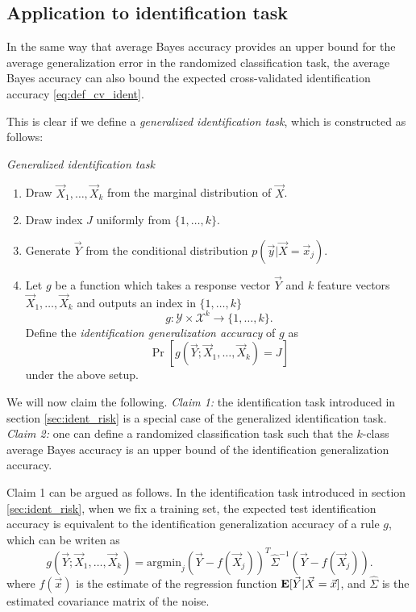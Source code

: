 \subsection{Application to identification task}\label{sec:ident_to_aba}

In the same way that average Bayes accuracy provides an upper bound
for the average generalization error in the randomized classification
task, the average Bayes accuracy can also bound the expected
cross-validated identification accuracy \eqref{eq:def_cv_ident}.

This is clear if we define a \emph{generalized identification task},
which is constructed as follows:

\noindent\emph{Generalized identification task}
\begin{enumerate}
\item Draw $\vec{X}_1,\hdots, \vec{X}_k$ from the marginal distribution of $\vec{X}$.
\item Draw index $J$ uniformly from $\{1,\hdots, k\}$.
\item Generate $\vec{Y}$ from the conditional distribution $p(\vec{y}|\vec{X} = \vec{x}_j)$.
\item Let $g$ be a function which takes a response vector $\vec{Y}$
  and $k$ feature vectors $\vec{X}_1,\hdots, \vec{X}_k$ and outputs an index in $\{1,\hdots, k\}$
\[
g: \mathcal{Y} \times \mathcal{X}^k \to \{1,\hdots, k\}.
\]
Define the \emph{identification generalization accuracy} of $g$ as
\[
\Pr[g(\vec{Y}; \vec{X}_1,\hdots, \vec{X}_k) = J]
\]
under the above setup.
\end{enumerate}

We will now claim the following.  \emph{Claim 1:} the identification
task introduced in section \ref{sec:ident_risk} is a special case of
the generalized identification task.  \emph{Claim 2:} one can define a
randomized classification task such that the $k$-class average Bayes
accuracy is an upper bound of the identification generalization
accuracy.

Claim 1 can be argued as follows.  In the identification task
introduced in section \ref{sec:ident_risk}, when we fix a training
set, the expected test identification accuracy is equivalent to the
identification generalization accuracy of a rule $g$, which can be writen as
\[
g(\vec{Y}; \vec{X}_1,\hdots, \vec{X}_k) = \text{argmin}_j (\vec{Y} - f(\vec{X}_j))^T \hat{\Sigma}^{-1} (\vec{Y} - f(\vec{X}_j)).
\]
where $f(\vec{x})$ is the estimate of the regression function
$\textbf{E}[\vec{Y}|\vec{X}=\vec{x}]$, and $\hat{\Sigma}$ is the estimated
covariance matrix of the noise.

